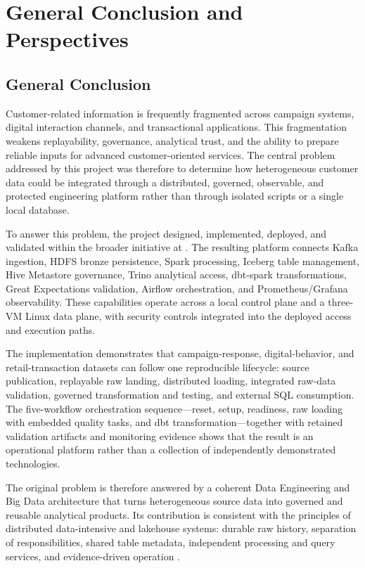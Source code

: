 \chapter{General Conclusion and Perspectives}

\section{General Conclusion}
Customer-related information is frequently fragmented across campaign systems, digital interaction channels, and transactional applications. This fragmentation weakens replayability, governance, analytical trust, and the ability to prepare reliable inputs for advanced customer-oriented services. The central problem addressed by this project was therefore to determine how heterogeneous customer data could be integrated through a distributed, governed, observable, and protected engineering platform rather than through isolated scripts or a single local database.

To answer this problem, the project designed, implemented, deployed, and validated \projectname{} within the broader \initiative{} initiative at \companyname. The resulting platform connects Kafka ingestion, HDFS bronze persistence, Spark processing, Iceberg table management, Hive Metastore governance, Trino analytical access, dbt-spark transformations, Great Expectations validation, Airflow orchestration, and Prometheus/Grafana observability. These capabilities operate across a local control plane and a three-VM Linux data plane, with security controls integrated into the deployed access and execution paths.

The implementation demonstrates that campaign-response, digital-behavior, and retail-transaction datasets can follow one reproducible lifecycle: source publication, replayable raw landing, distributed loading, integrated raw-data validation, governed transformation and testing, and external SQL consumption. The five-workflow orchestration sequence---reset, setup, readiness, raw loading with embedded quality tasks, and dbt transformation---together with retained validation artifacts and monitoring evidence shows that the result is an operational platform rather than a collection of independently demonstrated technologies.

The original problem is therefore answered by a coherent Data Engineering and Big Data architecture that turns heterogeneous source data into governed and reusable analytical products. Its contribution is consistent with the principles of distributed data-intensive and lakehouse systems: durable raw history, separation of responsibilities, shared table metadata, independent processing and query services, and evidence-driven operation \cite{kleppmann2017ddia,armbrust2021lakehouse,marz2015bigdata}.

